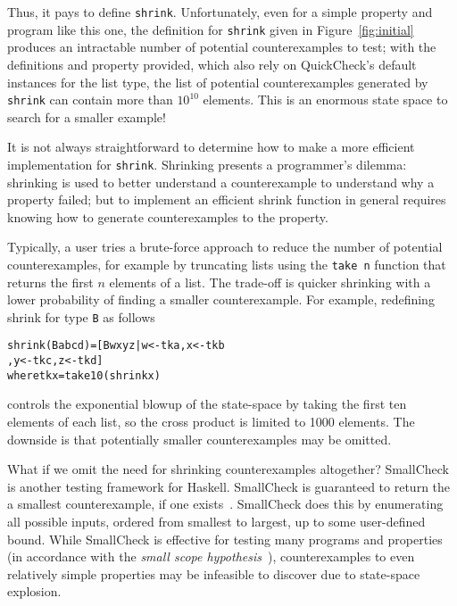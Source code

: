 \documentclass[9pt]{sigplanconf}
\newenvironment{code}{\begin{alltt}\scriptsize}{\end{alltt}}
\newcommand{\ttp}[1]{\texttt{#1}}
\begin{document}
Thus, it pays to define \ttp{shrink}.  Unfortunately, even for a simple property
and program like this one, the definition for \ttp{shrink} given in
Figure~\ref{fig:initial} produces an intractable number of potential
counterexamples to test; with the definitions and property provided, which also
rely on QuickCheck's default instances for the list type, the list of potential
counterexamples generated by \ttp{shrink} can contain more than $10^{10}$
elements.  This is an enormous state space to search for a smaller example!

It is not always straightforward to determine how to make a more efficient
implementation for \ttp{shrink}.  Shrinking presents a programmer's dilemma:
shrinking is used to better understand a counterexample to understand why a
property failed; but to implement an efficient shrink function in general
requires knowing how to generate counterexamples to the property.

Typically, a user tries a brute-force approach to reduce the number of potential
counterexamples, for example by truncating lists using the \ttp{take n} function
that returns the first $n$ elements of a list.  The trade-off is quicker
shrinking with a lower probability of finding a smaller counterexample.  For
example, redefining shrink for type \ttp{B} as follows
%
\begin{code}
shrink (B a b c d) = [ B w x y z | w <- tk a, x <- tk b
                                 , y <- tk c, z <- tk d ]
  where tk x = take 10 (shrink x)
\end{code}
%
\noindent
controls the exponential blowup of the state-space by taking the first ten
elements of each list, so the cross product is limited to 1000 elements.  The
downside is that potentially smaller counterexamples may be omitted.

What if we omit the need for shrinking counterexamples altogether?  SmallCheck
is another testing framework for Haskell.  SmallCheck is guaranteed to return
the a smallest counterexample, if one exists~\cite{sc}.  SmallCheck does this by
enumerating all possible inputs, ordered from smallest to largest, up to some
user-defined bound.  While SmallCheck is effective for testing many programs and
properties (in accordance with the \emph{small scope hypothesis}~\cite{jackson}),
counterexamples to even relatively simple properties may be infeasible to
discover due to state-space explosion.
\end{document}
